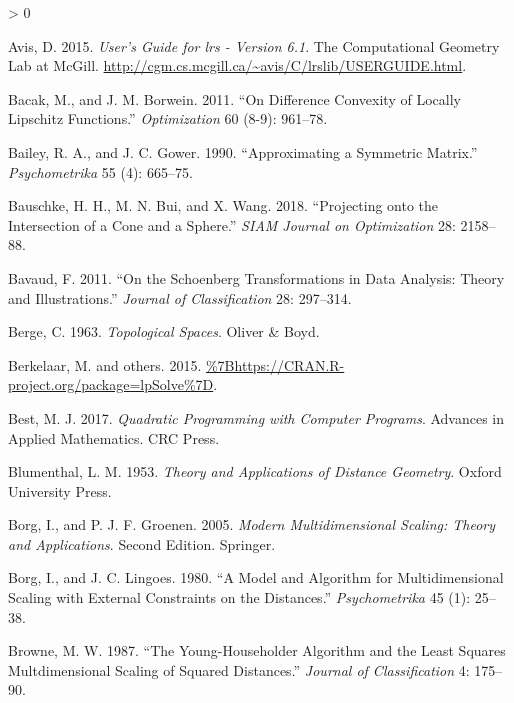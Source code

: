 \documentclass[
  12pt,
]{book}
\newlength{\cslhangindent}
\newenvironment{CSLReferences}[2] %
 {%
  \setlength{\parindent}{0pt}
  \ifodd #1 \everypar{\setlength{\hangindent}{\cslhangindent}}\ignorespaces\fi
  \ifnum #2 > 0
  \setlength{\parskip}{#2\baselineskip}
  \fi
 }%
 {}
\theoremstyle{definition}
\theoremstyle{definition}
\theoremstyle{definition}
\theoremstyle{definition}
\theoremstyle{remark}
\begin{document}
\hypertarget{refs}{}
\begin{CSLReferences}{1}{0}
\leavevmode\hypertarget{ref-avis_15}{}%
Avis, D. 2015. \emph{{User's Guide for lrs - Version 6.1}}. {The Computational Geometry Lab at McGill}. \url{http://cgm.cs.mcgill.ca/~avis/C/lrslib/USERGUIDE.html}.

\leavevmode\hypertarget{ref-bacak_borwein_11}{}%
Bacak, M., and J. M. Borwein. 2011. {``{On Difference Convexity of Locally Lipschitz Functions}.''} \emph{Optimization} 60 (8-9): 961--78.

\leavevmode\hypertarget{ref-bailey_gower_90}{}%
Bailey, R. A., and J. C. Gower. 1990. {``{Approximating a Symmetric Matrix}.''} \emph{Psychometrika} 55 (4): 665--75.

\leavevmode\hypertarget{ref-bauschke_bui_wang_18}{}%
Bauschke, H. H., M. N. Bui, and X. Wang. 2018. {``{Projecting onto the Intersection of a Cone and a Sphere}.''} \emph{SIAM Journal on Optimization} 28: 2158--88.

\leavevmode\hypertarget{ref-bavaud_11}{}%
Bavaud, F. 2011. {``{On the Schoenberg Transformations in Data Analysis: Theory and Illustrations}.''} \emph{Journal of Classification} 28: 297--314.

\leavevmode\hypertarget{ref-berge_63}{}%
Berge, C. 1963. \emph{Topological Spaces}. Oliver \& Boyd.

\leavevmode\hypertarget{ref-berkelaar_15}{}%
Berkelaar, M. and others. 2015. \url{\%7Bhttps://CRAN.R-project.org/package=lpSolve\%7D}.

\leavevmode\hypertarget{ref-best_17}{}%
Best, M. J. 2017. \emph{Quadratic Programming with Computer Programs}. Advances in Applied Mathematics. CRC Press.

\leavevmode\hypertarget{ref-blumenthal_53}{}%
Blumenthal, L. M. 1953. \emph{Theory and Applications of Distance Geometry}. Oxford University Press.

\leavevmode\hypertarget{ref-borg_groenen_05}{}%
Borg, I., and P. J. F. Groenen. 2005. \emph{{Modern Multidimensional Scaling: Theory and Applications}}. Second Edition. Springer.

\leavevmode\hypertarget{ref-borg_lingoes_80}{}%
Borg, I., and J. C. Lingoes. 1980. {``{A Model and Algorithm for Multidimensional Scaling with External Constraints on the Distances}.''} \emph{Psychometrika} 45 (1): 25--38.

\leavevmode\hypertarget{ref-browne_87}{}%
Browne, M. W. 1987. {``{The Young-Householder Algorithm and the Least Squares Multdimensional Scaling of Squared Distances}.''} \emph{Journal of Classification} 4: 175--90.


\end{CSLReferences}
\end{document}
